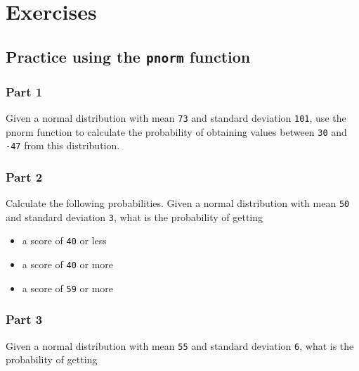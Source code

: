 \documentclass[12pt,]{krantz}
\providecommand{\tightlist}{%
  \setlength{\itemsep}{0pt}\setlength{\parskip}{0pt}}
\begin{document}
\hypertarget{sec:Foundationsexercises}{%
\section{Exercises}\label{sec:Foundationsexercises}}

\hypertarget{sec:Foundationsexercisespnorm}{%
\subsection{\texorpdfstring{Practice using the \texttt{pnorm} function}{Practice using the pnorm function}}\label{sec:Foundationsexercisespnorm}}

\hypertarget{sec:FoundationsexercisespnormPart1}{%
\subsubsection{Part 1}\label{sec:FoundationsexercisespnormPart1}}

Given a normal distribution with mean \texttt{73} and standard deviation \texttt{101}, use the pnorm function to calculate the probability of obtaining values between \texttt{30} and \texttt{-47} from this distribution.

\hypertarget{sec:FoundationsexercisespnormPart2}{%
\subsubsection{Part 2}\label{sec:FoundationsexercisespnormPart2}}

Calculate the following probabilities.
Given a normal distribution with mean \texttt{50} and standard deviation \texttt{3}, what is the probability of getting

\begin{itemize}
\tightlist
\item
  a score of \texttt{40} or less
\item
  a score of \texttt{40} or more
\item
  a score of \texttt{59} or more
\end{itemize}

\hypertarget{sec:FoundationsexercisespnormPart3}{%
\subsubsection{Part 3}\label{sec:FoundationsexercisespnormPart3}}

Given a normal distribution with mean \texttt{55} and standard deviation \texttt{6}, what is the probability of getting
\end{document}
